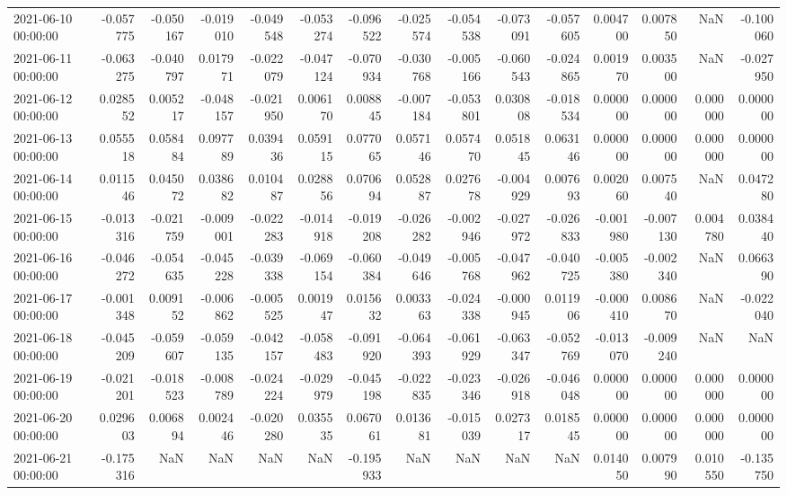 \begin{tabular}{lrrrrrrrrrrrrrr}
2021-06-10 00:00:00 & -0.057775 & -0.050167 & -0.019010 & -0.049548 & -0.053274 & -0.096522 & -0.025574 & -0.054538 & -0.073091 & -0.057605 & 0.004700 & 0.007850 & NaN & -0.100060 \\
2021-06-11 00:00:00 & -0.063275 & -0.040797 & 0.017971 & -0.022079 & -0.047124 & -0.070934 & -0.030768 & -0.005166 & -0.060543 & -0.024865 & 0.001970 & 0.003500 & NaN & -0.027950 \\
2021-06-12 00:00:00 & 0.028552 & 0.005217 & -0.048157 & -0.021950 & 0.006170 & 0.008845 & -0.007184 & -0.053801 & 0.030808 & -0.018534 & 0.000000 & 0.000000 & 0.000000 & 0.000000 \\
2021-06-13 00:00:00 & 0.055518 & 0.058484 & 0.097789 & 0.039436 & 0.059115 & 0.077065 & 0.057146 & 0.057470 & 0.051845 & 0.063146 & 0.000000 & 0.000000 & 0.000000 & 0.000000 \\
2021-06-14 00:00:00 & 0.011546 & 0.045072 & 0.038682 & 0.010487 & 0.028856 & 0.070694 & 0.052887 & 0.027678 & -0.004929 & 0.007693 & 0.002060 & 0.007540 & NaN & 0.047280 \\
2021-06-15 00:00:00 & -0.013316 & -0.021759 & -0.009001 & -0.022283 & -0.014918 & -0.019208 & -0.026282 & -0.002946 & -0.027972 & -0.026833 & -0.001980 & -0.007130 & 0.004780 & 0.038440 \\
2021-06-16 00:00:00 & -0.046272 & -0.054635 & -0.045228 & -0.039338 & -0.069154 & -0.060384 & -0.049646 & -0.005768 & -0.047962 & -0.040725 & -0.005380 & -0.002340 & NaN & 0.066390 \\
2021-06-17 00:00:00 & -0.001348 & 0.009152 & -0.006862 & -0.005525 & 0.001947 & 0.015632 & 0.003363 & -0.024338 & -0.000945 & 0.011906 & -0.000410 & 0.008670 & NaN & -0.022040 \\
2021-06-18 00:00:00 & -0.045209 & -0.059607 & -0.059135 & -0.042157 & -0.058483 & -0.091920 & -0.064393 & -0.061929 & -0.063347 & -0.052769 & -0.013070 & -0.009240 & NaN & NaN \\
2021-06-19 00:00:00 & -0.021201 & -0.018523 & -0.008789 & -0.024224 & -0.029979 & -0.045198 & -0.022835 & -0.023346 & -0.026918 & -0.046048 & 0.000000 & 0.000000 & 0.000000 & 0.000000 \\
2021-06-20 00:00:00 & 0.029603 & 0.006894 & 0.002446 & -0.020280 & 0.035535 & 0.067061 & 0.013681 & -0.015039 & 0.027317 & 0.018545 & 0.000000 & 0.000000 & 0.000000 & 0.000000 \\
2021-06-21 00:00:00 & -0.175316 & NaN & NaN & NaN & NaN & -0.195933 & NaN & NaN & NaN & NaN & 0.014050 & 0.007990 & 0.010550 & -0.135750 \\

\end{tabular}
